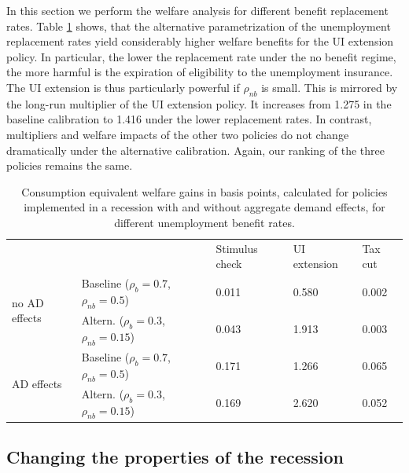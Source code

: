 \documentclass[../HAFiscal]{subfiles}
\begin{document}
In this section we perform the welfare analysis for different benefit replacement rates. Table \ref{tab:robustness_benefit_results} shows, that the alternative parametrization of the unemployment replacement rates yield considerably higher welfare benefits for the UI extension policy. In particular, the lower the replacement rate under the no benefit regime, the more harmful is the expiration of eligibility to the unemployment insurance. The UI extension is thus particularly powerful if $\rho_{nb}$ is small. This is mirrored by the long-run multiplier of the UI extension policy. It increases from 1.275 in the baseline calibration to 1.416 under the lower replacement rates. In contrast, multipliers and welfare impacts of the other two policies do not change dramatically under the alternative calibration. Again, our ranking of the three policies remains the same.


\begin{table}[]
	\begin{center}
		\begin{tabular}{@{}lllll@{}}
			\toprule
			&                    & Stimulus check & UI extension & Tax cut \\ \cmidrule(l){1-5} 
			\multirow{2}{*}{no AD effects} 	& Baseline  ($\rho_{b}=0.7$, $\rho_{nb}=0.5$) 		& 0.011          & 0.580        & 0.002   \\
			& Altern.  ($\rho_{b}=0.3$, $\rho_{nb}=0.15$) 	& 0.043          & 1.913        & 0.003   \\ \cmidrule(l){1-5} 
			\multirow{2}{*}{AD effects}		& Baseline  ($\rho_{b}=0.7$, $\rho_{nb}=0.5$)    	& 0.171          & 1.266        & 0.065   \\
			& Altern.  ($\rho_{b}=0.3$, $\rho_{nb}=0.15$)    & 0.169          & 2.620        & 0.052   \\ \cmidrule(l){1-5} 
		\end{tabular}
		\caption{Consumption equivalent welfare gains in basis points, calculated for policies implemented in a recession with and without aggregate demand effects, for different unemployment benefit rates.}
		\label{tab:robustness_benefit_results}
	\end{center}
\end{table}




\FloatBarrier
\subsection{Changing the properties of the recession}
\end{document}
